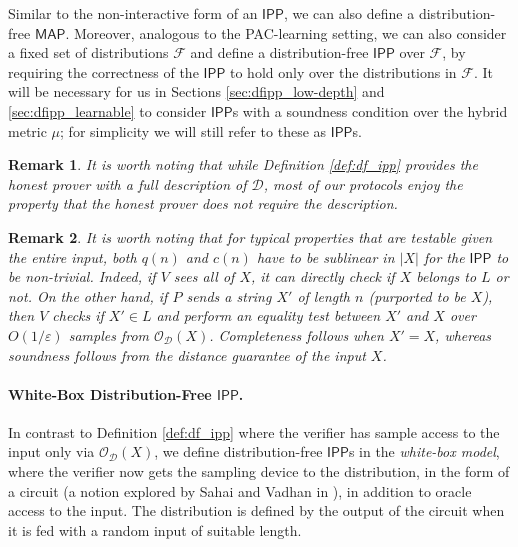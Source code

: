 \documentclass[11pt]{article}
\newtheorem{remark}{Remark}
\newcommand{\IPP}{\mathsf{IPP}}
\newcommand{\MAP}{\mathsf{MAP}}
\newcommand{\sD}{\mathcal{D}}
\newcommand{\sF}{\mathcal{F}}
\begin{document}
\noindent Similar to the non-interactive form of an $\IPP$, we can also define a distribution-free $\MAP$. Moreover, analogous to the PAC-learning setting, we can also consider a fixed set of distributions $\sF$ and define a distribution-free $\IPP$ over $\sF$, by requiring the correctness of the $\IPP$ to hold only over the distributions in $\sF$. It will be necessary for us in Sections \ref{sec:dfipp_low-depth} and \ref{sec:dfipp_learnable} to consider $\IPP$s with a soundness condition over the hybrid metric $\mu$; for simplicity we will still refer to these as $\IPP$s. 

\begin{remark}
    It is worth noting that while Definition \ref{def:df_ipp} provides the honest prover with a full description of $\sD$, most of our protocols enjoy the property that the honest prover does not require the description. 
\end{remark}

\begin{remark}
It is worth noting that for typical properties that are testable given the entire input, both $q(n)$ and $c(n)$ have to be sublinear in $\vert X \vert$ for the $\IPP$ to be non-trivial. Indeed, if $V$ sees all of $X$, it can directly check if $X$ belongs to $L$ or not. On the other hand, if $P$ sends a string $X'$ of length $n$ (purported to be $X$), then $V$ checks if $X' \in L$ and perform an equality test between $X'$ and $X$ over $O(1/\varepsilon)$ samples from $\mathcal{O}_\sD(X)$. Completeness follows when $X' = X$, whereas soundness follows from the distance guarantee of the input $X$. 
\end{remark}

\paragraph{White-Box Distribution-Free $\IPP$.}
In contrast to Definition \ref{def:df_ipp} where the verifier has sample access to the input only via $\mathcal{O}_\sD(X)$, we define distribution-free $\IPP$s in the \textit{white-box model}, where the verifier now gets the sampling device to the distribution, in the form of a circuit (a notion explored by Sahai and Vadhan in \cite{SV97}), in addition to oracle access to the input. The distribution is defined by the output of the circuit when it is fed with a random input of suitable length. 
\end{document}
